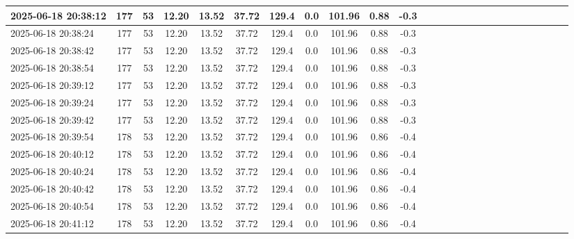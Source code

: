 \documentclass[UTF8,10pt,a4paper,fontset=fandol]{ctexart}
\begin{document}
\begin{tabular}{|p{2.15cm}|*{25}{c|}}
2025-06-18 20:38:12 & 177 & 53 & 12.20 & 13.52 & 37.72 & 129.4 & 0.0 & 101.96 & 0.88 & -0.3 & \z & \z & \z & \z & \z & \z & \z & \z & \z & \z & \z & \z & \z & \z & \z \\ \hline
2025-06-18 20:38:24 & 177 & 53 & 12.20 & 13.52 & 37.72 & 129.4 & 0.0 & 101.96 & 0.88 & -0.3 & \z & \z & \z & \z & \z & \z & \z & \z & \z & \z & \z & \z & \z & \z & \z \\ \hline
2025-06-18 20:38:42 & 177 & 53 & 12.20 & 13.52 & 37.72 & 129.4 & 0.0 & 101.96 & 0.88 & -0.3 & \z & \z & \z & \z & \z & \z & \z & \z & \z & \z & \z & \z & \z & \z & \z \\ \hline
2025-06-18 20:38:54 & 177 & 53 & 12.20 & 13.52 & 37.72 & 129.4 & 0.0 & 101.96 & 0.88 & -0.3 & \z & \z & \z & \z & \z & \z & \z & \z & \z & \z & \z & \z & \z & \z & \z \\ \hline
2025-06-18 20:39:12 & 177 & 53 & 12.20 & 13.52 & 37.72 & 129.4 & 0.0 & 101.96 & 0.88 & -0.3 & \z & \z & \z & \z & \z & \z & \z & \z & \z & \z & \z & \z & \z & \z & \z \\ \hline
2025-06-18 20:39:24 & 177 & 53 & 12.20 & 13.52 & 37.72 & 129.4 & 0.0 & 101.96 & 0.88 & -0.3 & \z & \z & \z & \z & \z & \z & \z & \z & \z & \z & \z & \z & \z & \z & \z \\ \hline
2025-06-18 20:39:42 & 177 & 53 & 12.20 & 13.52 & 37.72 & 129.4 & 0.0 & 101.96 & 0.88 & -0.3 & \z & \z & \z & \z & \z & \z & \z & \z & \z & \z & \z & \z & \z & \z & \z \\ \hline
2025-06-18 20:39:54 & 178 & 53 & 12.20 & 13.52 & 37.72 & 129.4 & 0.0 & 101.96 & 0.86 & -0.4 & \z & \z & \z & \z & \z & \z & \z & \z & \z & \z & \z & \z & \z & \z & \z \\ \hline
2025-06-18 20:40:12 & 178 & 53 & 12.20 & 13.52 & 37.72 & 129.4 & 0.0 & 101.96 & 0.86 & -0.4 & \z & \z & \z & \z & \z & \z & \z & \z & \z & \z & \z & \z & \z & \z & \z \\ \hline
2025-06-18 20:40:24 & 178 & 53 & 12.20 & 13.52 & 37.72 & 129.4 & 0.0 & 101.96 & 0.86 & -0.4 & \z & \z & \z & \z & \z & \z & \z & \z & \z & \z & \z & \z & \z & \z & \z \\ \hline
2025-06-18 20:40:42 & 178 & 53 & 12.20 & 13.52 & 37.72 & 129.4 & 0.0 & 101.96 & 0.86 & -0.4 & \z & \z & \z & \z & \z & \z & \z & \z & \z & \z & \z & \z & \z & \z & \z \\ \hline
2025-06-18 20:40:54 & 178 & 53 & 12.20 & 13.52 & 37.72 & 129.4 & 0.0 & 101.96 & 0.86 & -0.4 & \z & \z & \z & \z & \z & \z & \z & \z & \z & \z & \z & \z & \z & \z & \z \\ \hline
2025-06-18 20:41:12 & 178 & 53 & 12.20 & 13.52 & 37.72 & 129.4 & 0.0 & 101.96 & 0.86 & -0.4 & \z & \z & \z & \z & \z & \z & \z & \z & \z & \z & \z & \z & \z & \z & \z \\ \hline
\end{tabular}
\end{document}
